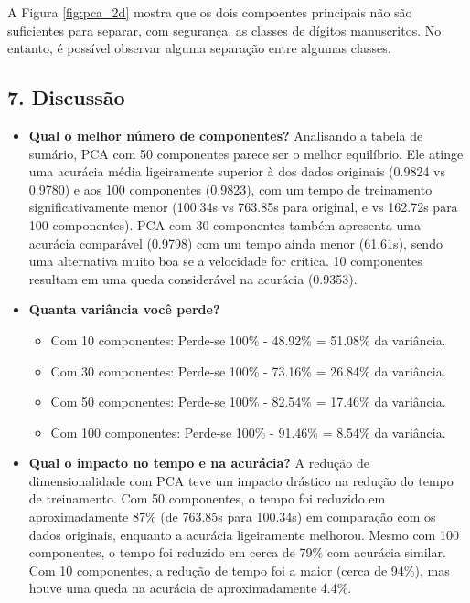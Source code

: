 \documentclass{article}
\begin{document}
A Figura \ref{fig:pca_2d} mostra que os dois compoentes principais não são suficientes para separar, com segurança, as classes de dígitos manuscritos. No entanto, é possível observar alguma separação entre algumas classes.

\subsection{7. Discussão}
\begin{itemize}
    \item \textbf{Qual o melhor número de componentes?} Analisando a tabela de sumário, PCA com 50 componentes parece ser o melhor equilíbrio. Ele atinge uma acurácia média ligeiramente superior à dos dados originais (0.9824 vs 0.9780) e aos 100 componentes (0.9823), com um tempo de treinamento significativamente menor (100.34s vs 763.85s para original, e vs 162.72s para 100 componentes). PCA com 30 componentes também apresenta uma acurácia comparável (0.9798) com um tempo ainda menor (61.61s), sendo uma alternativa muito boa se a velocidade for crítica. 10 componentes resultam em uma queda considerável na acurácia (0.9353).
    \item \textbf{Quanta variância você perde?}
        \begin{itemize}
            \item Com 10 componentes: Perde-se 100\% - 48.92\% = 51.08\% da variância.
            \item Com 30 componentes: Perde-se 100\% - 73.16\% = 26.84\% da variância.
            \item Com 50 componentes: Perde-se 100\% - 82.54\% = 17.46\% da variância.
            \item Com 100 componentes: Perde-se 100\% - 91.46\% = 8.54\% da variância.
        \end{itemize}
    \item \textbf{Qual o impacto no tempo e na acurácia?} A redução de dimensionalidade com PCA teve um impacto drástico na redução do tempo de treinamento. Com 50 componentes, o tempo foi reduzido em aproximadamente 87\% (de 763.85s para 100.34s) em comparação com os dados originais, enquanto a acurácia ligeiramente melhorou. Mesmo com 100 componentes, o tempo foi reduzido em cerca de 79\% com acurácia similar. Com 10 componentes, a redução de tempo foi a maior (cerca de 94\%), mas houve uma queda na acurácia de aproximadamente 4.4\%.
\end{itemize}
\end{document}
